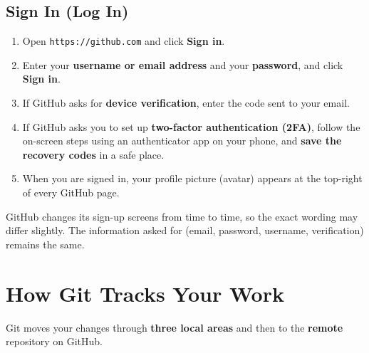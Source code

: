 \documentclass[11pt,a4paper]{article}
\newcommand{\code}[1]{\texttt{#1}}
\newcommand{\menu}[1]{\textsf{\textbf{#1}}}
\begin{document}
\subsection{Sign In (Log In)}

\begin{enumerate}
\item Open \code{https://github.com} and click \menu{Sign in}.
\item Enter your \textbf{username or email address} and your \textbf{password}, and click \menu{Sign in}.
\item If GitHub asks for \textbf{device verification}, enter the code sent to your email.
\item If GitHub asks you to set up \textbf{two-factor authentication (2FA)}, follow the on-screen steps using an authenticator app on your phone, and \textbf{save the recovery codes} in a safe place.
\item When you are signed in, your profile picture (avatar) appears at the top-right of every GitHub page.
\end{enumerate}

\begin{notebox}
GitHub changes its sign-up screens from time to time, so the exact wording may differ slightly. The information asked for (email, password, username, verification) remains the same.
\end{notebox}

\section{How Git Tracks Your Work}

Git moves your changes through \textbf{three local areas} and then to the \textbf{remote} repository on GitHub.
\end{document}
